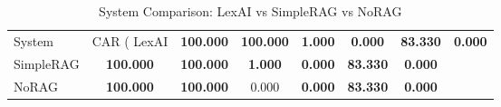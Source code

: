 \begin{table}[H]
\centering
\caption{System Comparison: LexAI vs SimpleRAG vs NoRAG}
\label{tab:system_comparison}
\begin{tabular}{lcccccc}
\toprule
System & CAR (%
\midrule
LexAI & \textbf{100.000} & \textbf{100.000} & \textbf{1.000} & \textbf{0.000} & \textbf{83.330} & \textbf{0.000} \\
SimpleRAG & \textbf{100.000} & \textbf{100.000} & \textbf{1.000} & \textbf{0.000} & \textbf{83.330} & \textbf{0.000} \\
NoRAG & \textbf{100.000} & \textbf{100.000} & 0.000 & \textbf{0.000} & \textbf{83.330} & \textbf{0.000} \\
\bottomrule
\end{tabular}
\end{table}